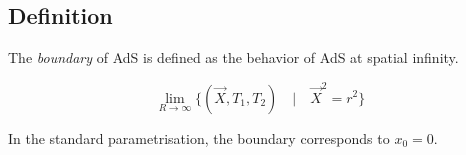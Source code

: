 \subsection{Definition}  %

The {\em boundary} of AdS is defined as the behavior of AdS at spatial infinity.

\begin{equation}
\lim_{R \to \infty} \{(\vec{X},T_1,T_2)\quad|\quad\vec{X}^2=r^2\}
\end{equation}

In the standard parametrisation, the boundary corresponds to $x_0=0$.


